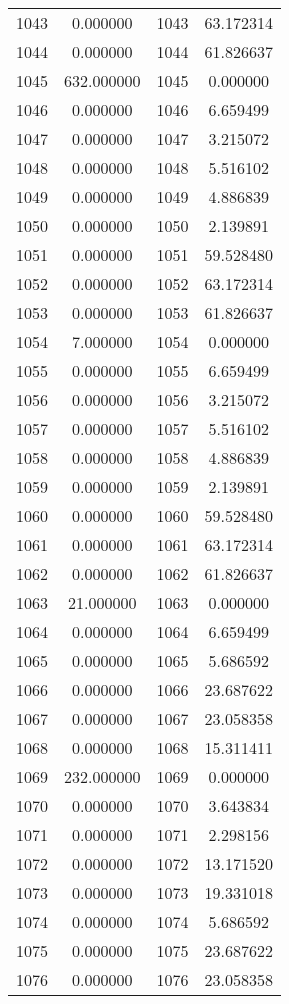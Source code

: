 \documentclass[12pt]{article}
\begin{document}
\begin{longtable}{@{}cccc@{}}
1043 & 0.000000 & 1043 & 63.172314 \\
1044 & 0.000000 & 1044 & 61.826637 \\
1045 & 632.000000 & 1045 & 0.000000 \\
1046 & 0.000000 & 1046 & 6.659499 \\
1047 & 0.000000 & 1047 & 3.215072 \\
1048 & 0.000000 & 1048 & 5.516102 \\
1049 & 0.000000 & 1049 & 4.886839 \\
1050 & 0.000000 & 1050 & 2.139891 \\
1051 & 0.000000 & 1051 & 59.528480 \\
1052 & 0.000000 & 1052 & 63.172314 \\
1053 & 0.000000 & 1053 & 61.826637 \\
1054 & 7.000000 & 1054 & 0.000000 \\
1055 & 0.000000 & 1055 & 6.659499 \\
1056 & 0.000000 & 1056 & 3.215072 \\
1057 & 0.000000 & 1057 & 5.516102 \\
1058 & 0.000000 & 1058 & 4.886839 \\
1059 & 0.000000 & 1059 & 2.139891 \\
1060 & 0.000000 & 1060 & 59.528480 \\
1061 & 0.000000 & 1061 & 63.172314 \\
1062 & 0.000000 & 1062 & 61.826637 \\
1063 & 21.000000 & 1063 & 0.000000 \\
1064 & 0.000000 & 1064 & 6.659499 \\
1065 & 0.000000 & 1065 & 5.686592 \\
1066 & 0.000000 & 1066 & 23.687622 \\
1067 & 0.000000 & 1067 & 23.058358 \\
1068 & 0.000000 & 1068 & 15.311411 \\
1069 & 232.000000 & 1069 & 0.000000 \\
1070 & 0.000000 & 1070 & 3.643834 \\
1071 & 0.000000 & 1071 & 2.298156 \\
1072 & 0.000000 & 1072 & 13.171520 \\
1073 & 0.000000 & 1073 & 19.331018 \\
1074 & 0.000000 & 1074 & 5.686592 \\
1075 & 0.000000 & 1075 & 23.687622 \\
1076 & 0.000000 & 1076 & 23.058358 \\

\end{longtable}
\end{document}
